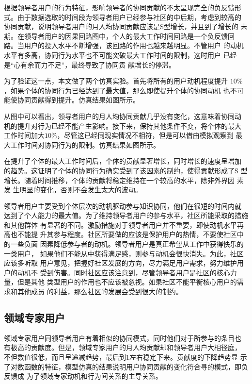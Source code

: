 根据领导者用户的行为特征，影响领导者的协同贡献的不太呈现完全的负反馈形
式。由于数据选取的时间段为领导者用户已经参与社区的中后期，考虑到较高的
协同贡献，说明领导者用户的月人均协同贡献应该是S型增长，并且到了增长的
末期。在领导者用户的因果回路图中，个人的最大工作时间回路是一个负反馈回
路。当用户的投入水平不断增强，该回路的作用也越来越明显。不管用户
的动机水平有多高，协同行为水平也不可能突破最大工作时间的限制，这时用户
已经是“心有余而力不足”，最终导致了协同贡
献增长的停滞。

为了验证这一点，本文做了两个仿真实验。首先将所有的用户动机程度提升
$10\%$，如果个体的协同行为已经达到了最大值，那么即使提升个体的协同动机
也不可能使协同贡献得到提升。仿真结果如图所示。

从图中可以看出，领导者用户的月人均协同贡献几乎没有变化，这意味着协同动
机的提升对行为已经不能产生影响。接下来，保持其他条件不变，将个体的最大
工作时间加大$10\%$，尽管这已经同现实情况不相符，但是可以借由模拟观察到
最大工作时间对协同行为的限制。仿真结果如图所示。

在提升了个体的最大工作时间后，个体的贡献显著增长，同时增长的速度呈增加
的趋势。这证明了个体的协同行为确实受到了该因素的制约，使得贡献形成了S
型增长。随着时间推移，个体的贡献将稳定维持在一个较高的水平，除非外界因
素发
生明显的变化，否则不会发生太大的波动。

领导者用户主要受到个体层次的动机驱动参与知识协同，他们在很短的时间内就
达到了个人能力的最大值。为了维持领导者用户的参与水平，社区所能采取的措施和其他群体
有显著的不同。激励措施对于领导者用户并不重要，即使动机水平再高也不能提
升其参与程度。社区所要做的应该是保护用户的热情，不要使社区中的一些负面
因素降低参与者的动机。领导者用户是真正希望从工作中获得快乐的一类用户，
如果他们不能从中获得满足感，则参与动机会很快消失。为此，社区应该多听取
用户意见，把握好社区发展的方向，尽力满足用户需求，努力维护用户的动机不
受到伤害。同时社区应该注意到，尽管领导者用户是社区的核心力量，但是其他
类型用户的作用也不应该被忽视。如果社区不能平衡核心用户的需求和其他成员
的利益，那么社区的发展会受到很大的制约。

\subsection{领域专家用户}
领域专家用户同领导者用户有着相似的协同模式，同时他们对于所参与的条目也
有极高的贡献度。但是，领域专家用户的月人均贡献却和领导者用户大相径庭，
不但数值很低，而且呈递减趋势，最后到1左右稳定下来。贡献度的下降趋势显
示了对数函数的特征，模型仿真的结果说明用户协同贡献的变化符合寻的模式，即负反馈成
为了领域专家动机和行为间关系的主导关系。

